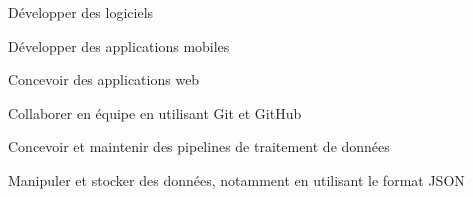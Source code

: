 

\begin{cvskills}

  \begin{minipage}[t]{0.45\textwidth}
    \cvskill
      {Développer des logiciels}
  \end{minipage}\hfill
  \begin{minipage}[t]{0.45\textwidth}
    \cvskill
      {Développer des applications mobiles}
  \end{minipage}

  \begin{minipage}[t]{0.45\textwidth}
    \cvskill
      {Concevoir des applications web}
  \end{minipage}\hfill
  \begin{minipage}[t]{0.45\textwidth}
    \cvskill
      {Collaborer en équipe en utilisant Git et GitHub}
  \end{minipage}

  \begin{minipage}[t]{0.45\textwidth}
    \cvskill
      {Concevoir et maintenir des pipelines de traitement de données}
  \end{minipage}\hfill
  \begin{minipage}[t]{0.45\textwidth}
    \cvskill
      {Manipuler et stocker des données, notamment en utilisant le format JSON}
  \end{minipage}

\end{cvskills}